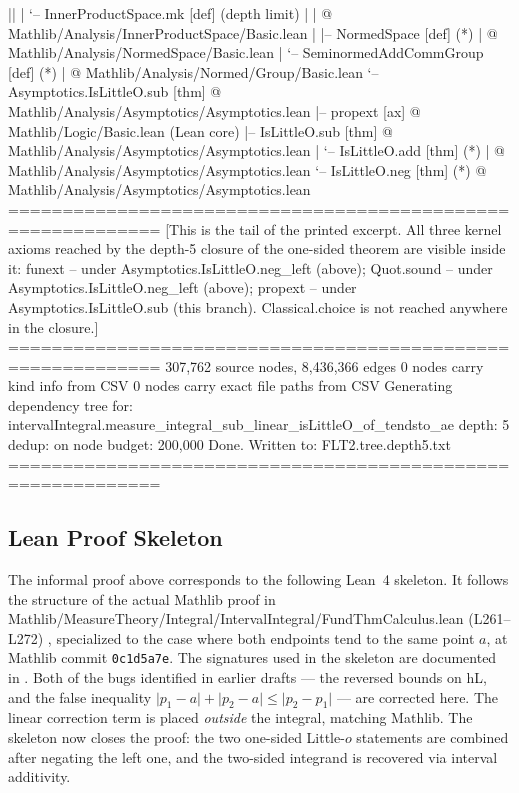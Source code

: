 \documentclass[11pt,reqno]{amsart}
\begin{document}
\begin{verbatimbox}
||   |   `-- InnerProductSpace.mk  [def]   (depth limit)
|   |   @ Mathlib/Analysis/InnerProductSpace/Basic.lean
|   |-- NormedSpace  [def]   (*)
|   @ Mathlib/Analysis/NormedSpace/Basic.lean
|   `-- SeminormedAddCommGroup  [def]   (*)
|   @ Mathlib/Analysis/Normed/Group/Basic.lean
`-- Asymptotics.IsLittleO.sub  [thm]
@ Mathlib/Analysis/Asymptotics/Asymptotics.lean
|-- propext  [ax]
@ Mathlib/Logic/Basic.lean (Lean core)
|-- IsLittleO.sub  [thm]
@ Mathlib/Analysis/Asymptotics/Asymptotics.lean
|   `-- IsLittleO.add  [thm]   (*)
|   @ Mathlib/Analysis/Asymptotics/Asymptotics.lean
`-- IsLittleO.neg  [thm]   (*)
@ Mathlib/Analysis/Asymptotics/Asymptotics.lean
============================================================
[This is the tail of the printed excerpt. All three kernel axioms
reached by the depth-5 closure of the one-sided theorem are visible
inside it:
funext      -- under Asymptotics.IsLittleO.neg_left (above);
Quot.sound  -- under Asymptotics.IsLittleO.neg_left (above);
propext     -- under Asymptotics.IsLittleO.sub    (this branch).
Classical.choice is not reached anywhere in the closure.]
============================================================
  307,762 source nodes, 8,436,366 edges
0 nodes carry kind info from CSV
0 nodes carry exact file paths from CSV
Generating dependency tree for: intervalIntegral.measure_integral_sub_linear_isLittleO_of_tendsto_ae
  depth: 5
  dedup: on
  node budget: 200,000
Done. Written to: FLT2.tree.depth5.txt
============================================================
\end{verbatimbox}
\text{ \ } \text{ \ }

\subsection{Lean Proof Skeleton}

\label{sec:lean-skeleton}

\noindent The informal proof above corresponds to the following Lean~4
skeleton. It follows the structure of the actual Mathlib proof in \textsf{%
Mathlib/MeasureTheory/Integral/IntervalIntegral/FundThmCalculus.lean}
(L261--L272) \cite{mathlib4-fundthm}, specialized to the case where both
endpoints tend to the same point $a$, at Mathlib commit \texttt{0c1d5a7e}{}.
The signatures used in the skeleton are documented in \cite{mathlib4-docs}.
Both of the bugs identified in earlier drafts --- the reversed bounds on 
\textsf{hL}, and the false inequality $\lvert p_1 - a\rvert + \lvert p_2 -
a\rvert \le \lvert p_2 - p_1\rvert$ --- are corrected here. The linear
correction term is placed \emph{outside} the integral, matching Mathlib. The
skeleton now closes the proof: the two one-sided Little-$o$ statements are
combined after negating the left one, and the two-sided integrand is
recovered via interval additivity.
\end{document}
